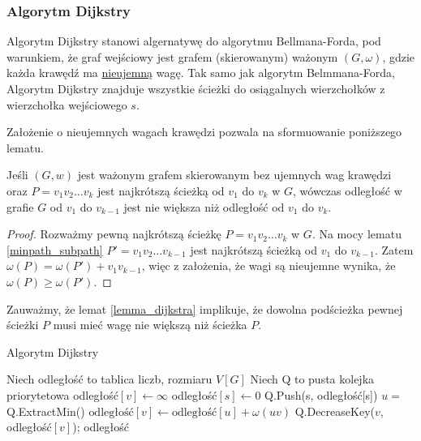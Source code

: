 \subsubsection{Algorytm Dijkstry}
Algorytm Dijkstry stanowi algernatywę do algorytmu
Bellmana-Forda, pod warunkiem, że graf wejściowy
jest grafem (skierowanym) ważonym $(G, \omega)$, 
gdzie każda krawędź ma \underline{nieujemną} wagę. 
Tak samo jak algorytm Belmmana-Forda, 
Algorytm Dijkstry znajduje wszystkie ścieżki 
do osiągalnych wierzchołków z 
wierzchołka wejściowego $s$. 

Założenie o nieujemnych wagach krawędzi pozwala na 
sformuowanie poniższego lematu.
\begin{lemma}
	Jeśli $(G, w)$ jest ważonym grafem skierowanym
	bez ujemnych wag krawędzi oraz $P = v_1v_2\dots v_k$
	jest najkrótszą ścieżką od $v_1$ do $v_k$ w $G$,
	wówczas odległość w grafie $G$ od $v_1$ do $v_{k-1}$ jest 
	nie większa niż odległość od $v_1$ do $v_k$.
	\begin{proof}
		Rozważmy pewną najkrótszą ścieżkę $P = v_1v_2
		\dots v_k$ w $G$. Na mocy lematu 
		\ref{minpath_subpath} $P'=v_1v_2 \dots v_{k-1}$
		jest najkrótszą ścieżką od $v_1$ do $v_{k-1}$.
		Zatem $\omega(P) = \omega(P') + v_1v_{k-1}$, więc
		z założenia, że wagi są nieujemne
		wynika, że  
		$\omega(P) \geq \omega(P')$. 
	\end{proof}
	\label{lemma_dijkstra}
\end{lemma}

Zauważmy, że lemat \ref{lemma_dijkstra} implikuje, że
dowolna podścieżka pewnej ścieżki $P$ musi mieć wagę
nie większą niż ścieżka $P$.

\begin{algorithm}[H]
	\caption{Algorytm Dijkstry}\label{dijkstra_alg}
	\begin{algorithmic}[1]
		\State Niech odległość to tablica liczb, rozmiaru $V[G]$
		\State Niech Q to pusta kolejka priorytetowa 
		\State odległość$[v]\gets\infty$
		\EndFor
		\State odległość$[s]\gets 0$
		\State Q.Push(s, odległość[s])
		\State $u =$ Q.ExtractMin()
		\State $\text{odległość}[v] \gets \text{odległość}[u] + \omega(uv)$
		\State Q.DecreaseKey($v$, odległość$[v]$);
		\EndIf
		\EndFor
		\EndWhile
		\State \Return odległość
		\EndProcedure
	\end{algorithmic}
	\label{dijkstra}
\end{algorithm}

